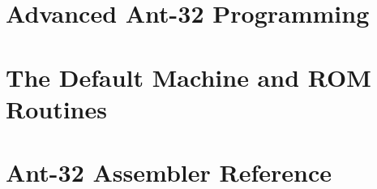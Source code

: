 \documentclass[11pt,makeidx,psfig]{book}
\begin{document}
\mainmatter



\chapter{Advanced Ant-32 Programming}
\label{advanced-programming-chap}




\appendix

\chapter{The Default Machine and ROM Routines}
\label{rom-chapter}


\chapter{Ant-32 Assembler Reference}
\label{ant32-asm-chapter}


\backmatter

\printindex
\end{document}
